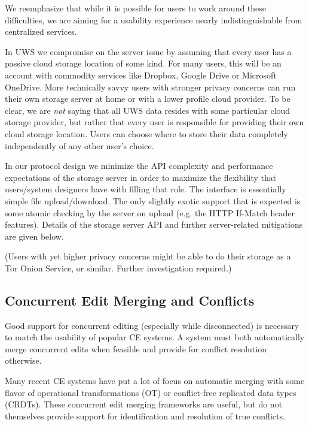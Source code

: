 \documentclass{article}
\begin{document}

We reemphasize that while it is possible for users to work around these difficulties, we are aiming for a usability experience nearly indistinguishable from centralized services.

In UWS we compromise on the server issue by assuming that every user has a passive cloud storage location of some kind.
For many users, this will be an account with commodity services like Dropbox, Google Drive or Microsoft OneDrive.
More technically savvy users with stronger privacy concerns can run their own storage server at home or with a lower profile cloud provider.
To be clear, we are \emph{not} saying that all UWS data resides with some particular cloud storage provider, but rather that every user is responsible for providing their own cloud storage location.
Users can choose where to store their data completely independently of any other user's choice.

In our protocol design we minimize the API complexity and performance expectations of the storage server in order to maximize the flexibility that users/system designers have with filling that role.
The interface is essentially simple file upload/download.
The only slightly exotic support that is expected is some atomic checking by the server on upload (e.g. the HTTP If-Match header features).
Details of the storage server API and further server-related mitigations are given below.

(Users with yet higher privacy concerns might be able to do their storage as a Tor Onion Service, or similar.
Further investigation required.)

\subsection{Concurrent Edit Merging and Conflicts}

Good support for concurrent editing (especially while disconnected) is necessary to match the usability of popular CE systems.
A system must both automatically merge concurrent edits when feasible and provide for conflict resolution otherwise.

Many recent CE systems have put a lot of focus on automatic merging with some flavor of operational transformations (OT) or conflict-free replicated data types (CRDTs).
These concurrent edit merging frameworks are useful, but do not themselves provide support for identification and resolution of true conflicts.
\end{document}
